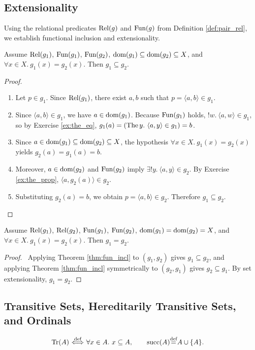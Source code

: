 \documentclass[10pt,a4paper]{article}
\renewcommand{\myprf}{\begin{proof}}
\renewcommand{\myqed}{\end{proof}}
\begin{document}
\subsection{Extensionality}\label{sec:extensionality}
Using the relational predicates ${\textrm{Rel}}(g)$ and ${\textrm{Fun}}(g)$ from Definition \ref{def:pair_rel}, we establish functional inclusion and extensionality.

\begin{theorem}\label{thm:fun_incl}
Assume ${\textrm{Rel}}(g_1)$, ${\textrm{Fun}}(g_1)$, ${\textrm{Fun}}(g_2)$, ${\textrm{dom}}(g_1)\subseteq{\textrm{dom}}(g_2)\subseteq X$, and $\forall x\in X.\ g_1(x)=g_2(x)$. Then $g_1\subseteq g_2$.
\end{theorem}
\myprf
\begin{enumerate}
\item Let $p \in g_1$. Since ${\textrm{Rel}}(g_1)$, there exist $a, b$ such that $p = \langle a, b\rangle \in g_1$.
\item Since $\langle a, b\rangle \in g_1$, we have $a \in {\textrm{dom}}(g_1)$. Because ${\textrm{Fun}}(g_1)$ holds, $!w.\ \langle a,w\rangle \in g_1$, so by Exercise \ref{ex:the_eq}, $g_1(a) = ({\textrm{The\,}} y.\ \langle a,y\rangle \in g_1) = b$.
\item Since $a \in {\textrm{dom}}(g_1) \subseteq {\textrm{dom}}(g_2) \subseteq X$, the hypothesis $\forall x \in X.\ g_1(x) = g_2(x)$ yields $g_2(a) = g_1(a) = b$.
\item Moreover, $a \in {\textrm{dom}}(g_2)$ and ${\textrm{Fun}}(g_2)$ imply $\exists !y.\ \langle a,y\rangle \in g_2$. By Exercise \ref{ex:the_prop}, $\langle a, g_2(a)\rangle \in g_2$.
\item Substituting $g_2(a) = b$, we obtain $p = \langle a, b\rangle \in g_2$. Therefore $g_1 \subseteq g_2$.
\end{enumerate}
\myqed

\begin{theorem}\label{thm:fun_ext}
Assume ${\textrm{Rel}}(g_1)$, ${\textrm{Rel}}(g_2)$, ${\textrm{Fun}}(g_1)$, ${\textrm{Fun}}(g_2)$, ${\textrm{dom}}(g_1) = {\textrm{dom}}(g_2) = X$, and $\forall x\in X.\ g_1(x)=g_2(x)$. Then $g_1 = g_2$.
\end{theorem}
\myprf\ Applying Theorem \ref{thm:fun_incl} to $(g_1, g_2)$ gives $g_1 \subseteq g_2$, and applying Theorem \ref{thm:fun_incl} symmetrically to $(g_2, g_1)$ gives $g_2 \subseteq g_1$. By set extensionality, $g_1 = g_2$. \myqed
\subsection{Transitive Sets, Hereditarily Transitive Sets, and Ordinals}\label{sec:ordinals}
\begin{definition}
$$\Tr(A) \propdef \forall x\in A.\ x\subseteq A, \qquad \mysucc(A) \eqdef A \cup \{A\}.$$
\end{definition}
\end{document}
